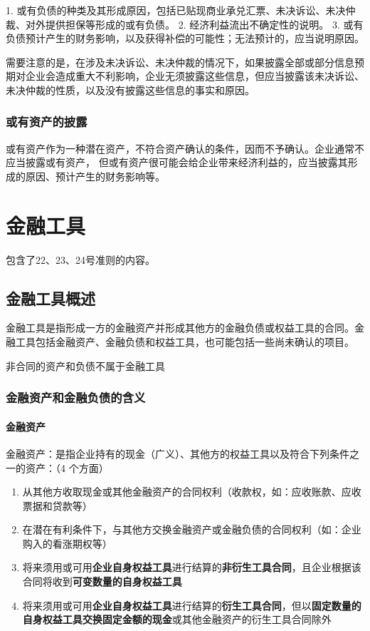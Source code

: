 \documentclass[UTF8,12pt]{ctexart}
\numberwithin{equation}{section} %
\numberwithin{figure}{section}
\numberwithin{table}{section}
\begin{document}
	1.	或有负债的种类及其形成原因，包括已贴现商业承兑汇票、未决诉讼、未决仲裁、对外提供担保等形成的或有负债。
	2.	经济利益流出不确定性的说明。
	3.	或有负债预计产生的财务影响，以及获得补偿的可能性；无法预计的，应当说明原因。
	
	需要注意的是，在涉及未决诉讼、未决仲裁的情况下，如果披露全部或部分信息预期对企业会造成重大不利影响，企业无须披露这些信息，但应当披露该未决诉讼、未决仲裁的性质，以及没有披露这些信息的事实和原因。
	
	
	\subsubsection{或有资产的披露}
	或有资产作为一种潜在资产，不符合资产确认的条件，因而不予确认。企业通常不应当披露或有资产， 但或有资产很可能会给企业带来经济利益的，应当披露其形成的原因、预计产生的财务影响等。
	
	
	\newpage
	\section{金融工具}
	包含了22、23、24号准则的内容。
	\subsection{金融工具概述}
	金融工具是指形成一方的金融资产并形成其他方的金融负债或权益工具的合同。金融工具包括金融资产、金融负债和权益工具，也可能包括一些尚未确认的项目。
	
	非合同的资产和负债不属于金融工具
	
	\subsubsection{金融资产和金融负债的含义}
	
	\paragraph{金融资产}
	金融资产：是指企业持有的现金（广义）、其他方的权益工具以及符合下列条件之一的资产：（4 个方面）
	\begin{enumerate}
		\item 从其他方收取现金或其他金融资产的合同权利（收款权，如：应收账款、应收票据和贷款等）
		
		\item 在潜在有利条件下，与其他方交换金融资产或金融负债的合同权利（如：企业购入的看涨期权等）
		
		\item 将来须用或可用\textbf{企业自身权益工具}进行结算的\textbf{非衍生工具合同}，且企业根据该合同将收到\textbf{可变数量的自身权益工具}
		
		\item 将来须用或可用\textbf{企业自身权益工具}进行结算的\textbf{衍生工具合同}，但以\textbf{固定数量的自身权益工具交换固定金额的现金}或其他金融资产的衍生工具合同除外
	\end{enumerate}
	
\end{document}
